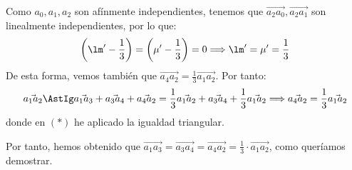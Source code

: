 \begin{ejercicio}
    Como $a_0,a_1,a_2$ son afínmente independientes, tenemos que $\vec{a_2a_0}, \vec{a_2a_1}$ son linealmente independientes, por lo que:
    \begin{equation*}
        \left(\lm' -\frac{1}{3}\right) = \left(\mu'-\frac{1}{3}\right) = 0 \Longrightarrow \lm' = \mu' = \frac{1}{3}
    \end{equation*}
    De esta forma, vemos también que $\vec{a_4a_2} = \frac{1}{3}\vec{a_1a_2}$. Por tanto:
    \begin{equation*}
        \vec{a_1a_2} \AstIg \vec{a_1a_3} + \vec{a_3a_4} + \vec{a_4a_2}
        = \frac{1}{3}\vec{a_1a_2} + \vec{a_3a_4} + \frac{1}{3}\vec{a_1a_2} \Longrightarrow \vec{a_4a_2} = \frac{1}{3}\vec{a_1a_2}
    \end{equation*}
    donde en $(\ast)$ he aplicado la igualdad triangular.

    Por tanto, hemos obtenido que $\vec{a_1a_3} = \vec{a_3a_4}= \vec{a_4a_2} = \frac{1}{3} \cdot \vec{a_1a_2}$, como queríamos demostrar.
\end{ejercicio}

